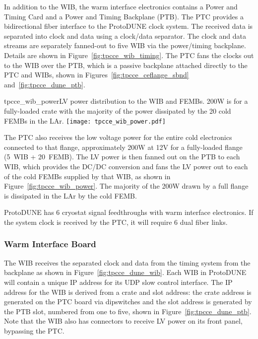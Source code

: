 In addition to the WIB, the warm interface electronics contains a
Power and Timing Card and a Power and Timing Backplane
(PTB). The PTC provides a bidirectional fiber interface to the
ProtoDUNE clock system.  The received data is separated into clock and
data using a clock/data separator.  The clock and data
streams are separately fanned-out to five WIB via the power/timing
backplane. Details are shown in
Figure~\ref{fig:tpcce_wib_timing}. The PTC fans the clocks out to the WIB over the
PTB, which is a passive backplane attached directly to the PTC and
WIBs, shown in Figures~\ref{fig:tpcce_ceflange_sbnd} and~\ref{fig:tpcce_dune_ptb}.

\begin{cdrfigure}{tpcce_wib_power}{LV power distribution 
to the WIB and FEMBs. 200W is for a fully-loaded crate 
with the majority of the power dissipated by the 20 cold FEMBs in the LAr.}
\texttt{[image: tpcce\_wib\_power.pdf]}
\end{cdrfigure}

The PTC also receives the low voltage power for the entire cold
electronics connected to that flange, approximately 200W at 12V for a
fully-loaded flange (5~WIB + 20~FEMB). The LV power is then fanned out
on the PTB to each WIB, which provides the DC/DC conversion and fans
the LV power out to each of the cold FEMBs supplied by that WIB, 
as shown in Figure~\ref{fig:tpcce_wib_power}. The 
majority of the 200W drawn by a full flange is dissipated in the LAr
by the cold FEMB.

ProtoDUNE has 6 cryostat signal feedthroughs with warm interface electronics. 
If the system clock is received by the PTC, it will require 6 dual fiber links.

\subsubsection{Warm Interface Board}
\label{subsubsec:warm_interface_board}

The WIB receives the separated clock and data from the timing system from the backplane
as shown in Figure~\ref{fig:tpcce_dune_wib}. Each WIB in ProtoDUNE will contain a 
unique IP address for its UDP slow control interface. The IP address for the WIB is 
derived from a crate and slot address: the crate address is generated on the PTC 
board via dipswitches and the slot address is generated by the PTB slot, numbered 
from one to five, shown in Figure~\ref{fig:tpcce_dune_ptb}. Note that the WIB also has 
connectors to receive LV power on its front panel, bypassing the PTC.

